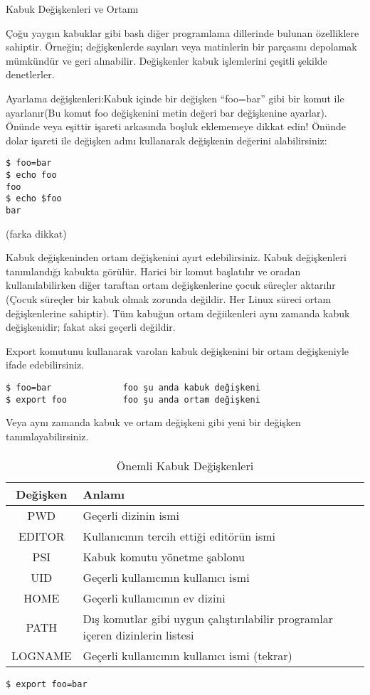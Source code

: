 \begin{section}{Kabuk Değişkenleri ve Ortamı}

Çoğu yaygın kabuklar gibi bash diğer programlama dillerinde bulunan özelliklere sahiptir. Örneğin; değişkenlerde sayıları veya matinlerin bir parçasını depolamak mümkündür ve geri alınabilir. Değişkenler kabuk işlemlerini çeşitli şekilde denetlerler.

Ayarlama değişkenleri:Kabuk içinde bir değişken “foo=bar” gibi bir komut ile ayarlanır(Bu komut foo değişkenini metin değeri bar değişkenine ayarlar). Önünde veya
eşittir işareti arkasında boşluk eklememeye dikkat edin! Önünde dolar işareti ile değişken adını kullanarak değişkenin değerini alabilirsiniz:
\begin{verbatim}
$ foo=bar
$ echo foo
foo
$ echo $foo
bar
\end{verbatim} 
 
(farka dikkat)

Kabuk değişkeninden ortam değişkenini ayırt edebilirsiniz. Kabuk değişkenleri tanımlandığı kabukta görülür. Harici bir komut başlatılır ve oradan kullanılabilirken diğer taraftan ortam değişkenlerine çocuk süreçler aktarılır (Çocuk süreçler bir kabuk olmak zorunda değildir. Her Linux süreci ortam değişkenlerine sahiptir). Tüm kabuğun ortam değiikenleri aynı zamanda kabuk değişkenidir; fakat aksi geçerli değildir.

Export komutunu kullanarak varolan kabuk değişkenini bir ortam değişkeniyle ifade edebilirsiniz.
\begin{verbatim}
$ foo=bar              foo şu anda kabuk değişkeni
$ export foo           foo şu anda ortam değişkeni
\end{verbatim}

Veya aynı zamanda kabuk ve ortam değişkeni gibi yeni bir değişken tanımlayabilirsiniz.

\paragraph{}{
\begin {table}[H]
\caption {Önemli Kabuk Değişkenleri} \label{tab:title} 
\begin{tabular}{c l}
\hline
Değişken & Anlamı\\
\hline
PWD		&  Geçerli dizinin ismi\\
EDITOR		&  Kullanıcının tercih ettiği editörün ismi\\
PSI	&	  Kabuk komutu yönetme şablonu\\
UID		&  Geçerli kullanıcının kullanıcı ismi\\
HOME		&  Geçerli kullanıcının ev dizini\\
PATH		&  Dış komutlar gibi uygun çalıştırılabilir programlar içeren dizinlerin listesi\\
LOGNAME	  & Geçerli kullanıcının kullanıcı ismi (tekrar)\\
\hline
\end{tabular}
\end {table}}
\begin{verbatim}
$ export foo=bar
\end{verbatim}


\end{section}
